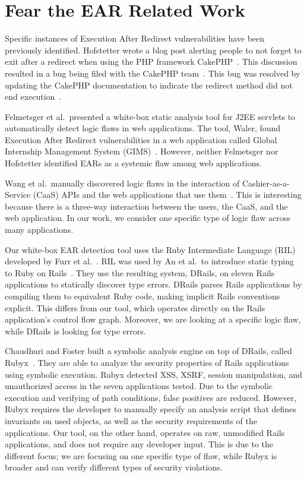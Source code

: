 \section{Fear the EAR Related Work}

Specific instances of Execution After Redirect vulnerabilities have
been previously identified. Hofstetter
wrote a blog post alerting people to not forget to exit after a
redirect when using the PHP framework CakePHP~\cite{hofstetter06:redirect}. This discussion
resulted in a bug being filed with the CakePHP
team~\cite{cake-ear-bug:06}. This bug was resolved by updating the CakePHP
documentation to indicate the redirect method
did not end execution~\cite{cake-doc-bug:06}.

Felmetsger et al.\ presented a white-box static analysis tool for J2EE
servlets to automatically detect logic flaws in web applications. The tool,
Waler, found Execution After Redirect vulnerabilities in a web application
called Global Internship Management System
(GIMS)~\cite{felmetsger10:logic}. However, neither Felmetsger nor
Hofstetter identified EARs as a systemic flaw among web applications.

Wang et al.\ manually discovered logic flaws in the
interaction of Cashier-as-a-Service (CaaS) APIs and the web
applications that use them~\cite{wang11:caas}. This is interesting because there is a
three-way interaction between the users, the CaaS, and the web application. In
our work, we consider one specific type of logic flaw across many
applications.

Our white-box EAR detection tool uses the Ruby Intermediate Language
(RIL) developed by Furr et al.~\cite{furr09:ril}. RIL was used by An
et al.\ to introduce static typing to Ruby on Rails~\cite{an09:stror}.
They use the resulting system, DRails, on eleven Rails applications to
statically discover type errors. DRails parses Rails applications by
compiling them to equivalent Ruby code, making implicit Rails
conventions explicit. This differs from our tool, which operates
directly on the Rails application's control flow graph. Moreover, we
are looking at a specific logic flaw, while DRails is looking for type
errors.

Chaudhuri and Foster built a symbolic analysis engine on top of DRails,
called Rubyx~\cite{chaudhuri10:ssarorwa}. They are able to analyze the
security properties of Rails applications using symbolic execution. Rubyx
detected XSS, XSRF, session manipulation, and unauthorized access in the
seven applications tested. Due to the symbolic execution and verifying of
path conditions, false positives are reduced. However, Rubyx requires the
developer to manually specify an analysis script that defines invariants on
used objects, as well as the security requirements of the applications. Our
tool, on the other hand, operates on raw, unmodified Rails applications,
and does not require any developer input. This is due to the different
focus; we are focusing on one specific type of flaw, while Rubyx is broader
and can verify different types of security violations.

